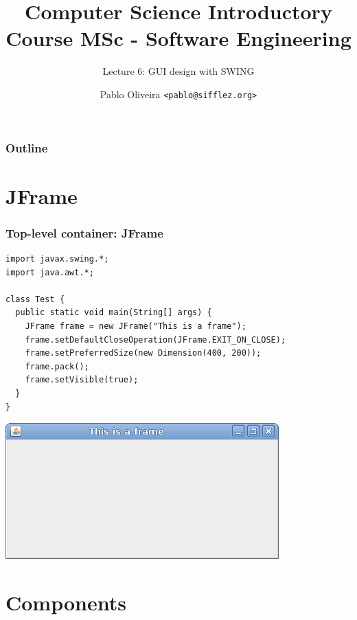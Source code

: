 \documentclass[10pt, handout]{beamer}
\title{Computer Science Introductory Course MSc - Software Engineering}
\subtitle{Lecture 6: GUI design with SWING}
\author[Pablo Oliveira]{Pablo Oliveira \texttt{<pablo@sifflez.org>}}
\institute{ENST}
\date{}
\begin{document}
\begin{frame}
  \titlepage
\end{frame}

\begin{frame}
  \frametitle{Outline}
  \tableofcontents
\end{frame}

\section{JFrame}
\begin{frame}[fragile]
  \frametitle{Top-level container: JFrame}
  \begin{verbatim}
import javax.swing.*;
import java.awt.*;

class Test {
  public static void main(String[] args) {
    JFrame frame = new JFrame("This is a frame");
    frame.setDefaultCloseOperation(JFrame.EXIT_ON_CLOSE);
    frame.setPreferredSize(new Dimension(400, 200));
    frame.pack();
    frame.setVisible(true);
  }
}
\end{verbatim}
\begin{center}
\includegraphics[width=0.6\linewidth]{frame}
\end{center}
\end{frame}

\section{Components}
\end{document}
